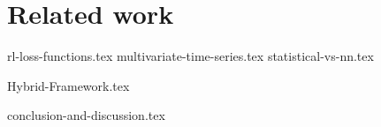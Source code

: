 
\chapter{Related work}\label{RelatedWorkMain}

{rl-loss-functions.tex}
{multivariate-time-series.tex}
{statistical-vs-nn.tex}

{Hybrid-Framework.tex}

{conclusion-and-discussion.tex}